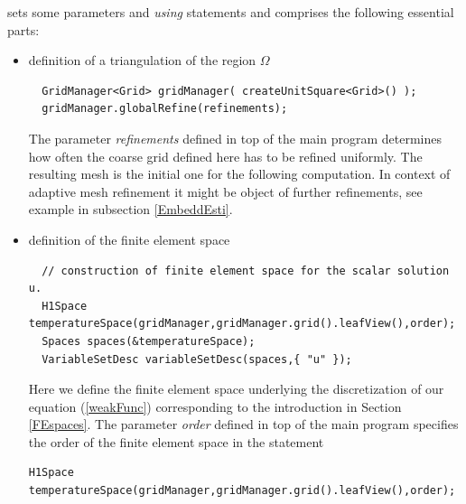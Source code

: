 \documentclass[11pt]{article}
\begin{document}
\noindent sets some parameters and \emph{using} statements and comprises the following essential parts:
\begin{itemize}
\item definition of a triangulation of the region $\Omega$
\begin{lstlisting}
  GridManager<Grid> gridManager( createUnitSquare<Grid>() );
  gridManager.globalRefine(refinements);
\end{lstlisting}

The parameter {\em refinements} defined in top of the main program
determines how often the coarse grid defined here has to be refined uniformly.
The resulting mesh is the initial one for the following computation.
In context of adaptive mesh refinement it might be object of further refinements,
see example in subsection \ref{EmbeddEsti}.


\item definition of the finite element space
\begin{lstlisting}
  // construction of finite element space for the scalar solution u.
  H1Space temperatureSpace(gridManager,gridManager.grid().leafView(),order);
  Spaces spaces(&temperatureSpace);
  VariableSetDesc variableSetDesc(spaces,{ "u" });
\end{lstlisting}

Here we define the finite element space underlying the discretization of our
equation (\ref{weakFunc}) corresponding to the introduction in Section \ref{FEspaces}.
The parameter {\em order} defined in top of the main program specifies the
order of the finite element space in the statement 

\begin{lstlisting}
H1Space temperatureSpace(gridManager,gridManager.grid().leafView(),order);
\end{lstlisting}




\end{itemize}
\end{document}
